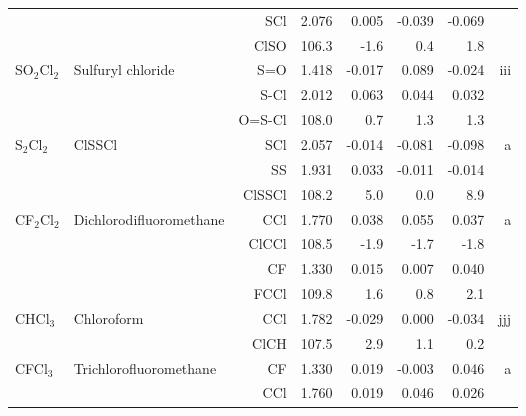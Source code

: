 \begin{table}
\begin{center}
\begin{tabular}{llrrrrrr}
             &                                    &SCl           &     2.076   &     0.005 &    -0.039 &    -0.069 &       \\
             &                                    &ClSO        &     106.3   &      -1.6 &       0.4 &       1.8   &       \\
 SO$_2$Cl$_2$      & Sulfuryl chloride                  &S=O           &     1.418   &    -0.017 &     0.089 &    -0.024 &   iii \\
             &                                    &S-Cl          &     2.012   &     0.063 &     0.044 &     0.032 &       \\
             &                                    &O=S-Cl      &     108.0   &       0.7 &       1.3 &       1.3   &       \\
 S$_2$Cl$_2$       & ClSSCl                             &SCl           &     2.057   &    -0.014 &    -0.081 &    -0.098 &     a \\
             &                                    &SS            &     1.931   &     0.033 &    -0.011 &    -0.014 &       \\
             &                                    &ClSSCl      &     108.2   &       5.0 &       0.0 &       8.9   &       \\
 CF$_2$Cl$_2$      & Dichlorodifluoromethane            &CCl           &     1.770   &     0.038 &     0.055 &     0.037 &     a \\
             &                                    &ClCCl       &     108.5   &      -1.9 &      -1.7 &      -1.8   &       \\
             &                                    &CF            &     1.330   &     0.015 &     0.007 &     0.040 &       \\
             &                                    &FCCl        &     109.8   &       1.6 &       0.8 &       2.1   &       \\
 CHCl$_3$       & Chloroform                         &CCl           &     1.782   &    -0.029 &     0.000 &    -0.034 &   jjj \\
             &                                    &ClCH        &     107.5   &       2.9 &       1.1 &       0.2   &       \\
 CFCl$_3$       & Trichlorofluoromethane             &CF            &     1.330   &     0.019 &    -0.003 &     0.046 &     a \\
             &                                    &CCl           &     1.760   &     0.019 &     0.046 &     0.026 &       \\

\end{tabular}
\end{center}
\end{table}
